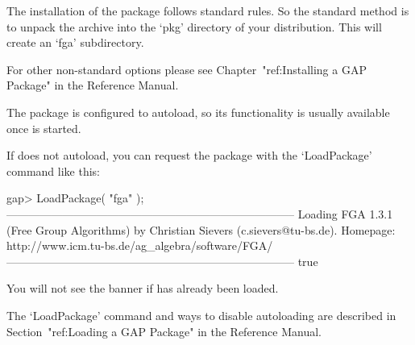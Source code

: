 

\null

The installation of the {\FGA} package follows standard {\GAP} rules.
So the standard method is to unpack the archive into the `pkg'
directory  of your {\GAP} distribution.  This will create an `fga'
subdirectory. 

For other non-standard options please see Chapter~"ref:Installing a
GAP Package" in the {\GAP} Reference Manual.


\null

The {\FGA} package is configured to autoload, so its functionality is
usually available once {\GAP} is started.

If {\GAP} does not autoload, you can request the package with the
`LoadPackage' command like this:

\testexamplefalse%
\beginexample
gap> LoadPackage( "fga" );
-----------------------------------------------------------------------------
Loading  FGA 1.3.1 (Free Group Algorithms)
by Christian Sievers (c.sievers@tu-bs.de).
Homepage: http://www.icm.tu-bs.de/ag_algebra/software/FGA/
-----------------------------------------------------------------------------
true
\endexample

You will not see the banner if {\FGA} has already been loaded.

The `LoadPackage' command and ways to disable autoloading are
described in Section~"ref:Loading a GAP Package" in the {\GAP}
Reference Manual.

